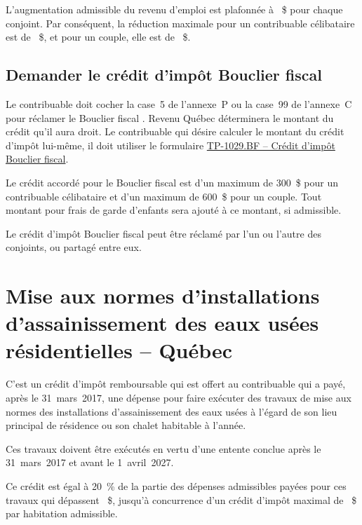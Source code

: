 \begin{note}
	L'augmentation admissible du revenu d'emploi est plafonnée à ~\$ pour chaque conjoint. Par conséquent, la réduction maximale pour un contribuable célibataire est de ~\$, et pour un couple, elle est de ~\$.
\end{note}

\subsection{Demander le crédit d'impôt Bouclier fiscal}
Le contribuable doit cocher la case~5 de l'annexe~P ou la case~99 de l'annexe~C pour réclamer le \og Bouclier fiscal \fg{}. Revenu Québec déterminera le montant du crédit qu'il aura droit. Le contribuable qui désire calculer le montant du crédit d'impôt lui-même, il doit utiliser le formulaire \href{https://www.revenuquebec.ca/fr/services-en-ligne/formulaires-et-publications/details-courant/tp-1029-bf/}{TP-1029.BF -- Crédit d'impôt Bouclier fiscal}.

Le crédit accordé pour le Bouclier fiscal est d'un maximum de 300~\$ pour un contribuable célibataire et d'un maximum de 600~\$ pour un couple. Tout montant pour frais de garde d'enfants sera ajouté à ce montant, si admissible.

Le crédit d'impôt Bouclier fiscal peut être réclamé par l'un ou l'autre des conjoints, ou partagé entre eux.



\section{Mise aux normes d'installations d'assainissement des eaux usées résidentielles -- Québec}
\begin{intro}
	C'est un crédit d'impôt remboursable qui est offert au contribuable qui a payé, après le 31~mars~2017, une dépense pour faire exécuter des travaux de mise aux normes des installations d'assainissement des eaux usées à l'égard de son lieu principal de résidence ou son chalet habitable à l'année. 
\end{intro}
Ces travaux doivent être exécutés en vertu d'une entente conclue après le 31~mars~2017 et avant le 1\ier{}~avril~2027.

Ce crédit est égal à 20~\% de la partie des dépenses admissibles payées pour ces travaux qui dépassent ~\$, jusqu'à concurrence d'un crédit d'impôt maximal de ~\$ par habitation admissible.


